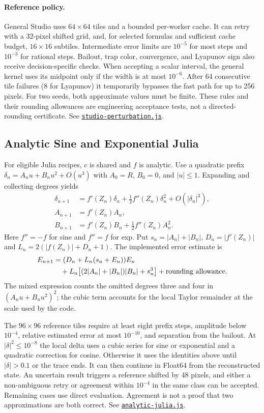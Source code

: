 \documentclass[11pt,a4paper]{article}
\numberwithin{equation}{section}
\newcommand{\abs}[1]{\lvert#1\rvert}
\newcommand{\code}[1]{\texttt{#1}}
\begin{document}
\paragraph{Reference policy.}
General Studio uses \(64\times64\) tiles and a bounded per-worker cache.
It can retry with a 32-pixel shifted grid, and, for selected formulas
and sufficient cache budget, \(16\times16\) subtiles. Intermediate
error limits are \(10^{-5}\) for most steps and \(10^{-3}\) for rational
steps. Bailout, trap color, convergence, and Lyapunov sign also receive
decision-specific checks. When accepting a scalar interval, the
general kernel uses its midpoint only if the width is at most
\(10^{-6}\). After 64 consecutive tile failures (8 for Lyapunov) it
temporarily bypasses the fast path for up to 256 pixels.
For two seeds, both approximate values must be finite. These rules and
their rounding allowances are engineering acceptance tests, not a
directed-rounding certificate. See
\href{../dist/studio-perturbation.js}{\code{studio-perturbation.js}}.

\subsection{Analytic Sine and Exponential Julia}

For eligible Julia recipes, \(c\) is shared and \(f\) is analytic.
Use a quadratic prefix \(\delta_n=A_nu+B_nu^2+O(u^3)\) with
\(A_0=R\), \(B_0=0\), and \(\abs u\le1\). Expanding and collecting
degrees yields
\begin{align}
  \delta_{n+1}
    &=f'(Z_n)\delta_n+\tfrac12f''(Z_n)\delta_n^2
      +O(\abs{\delta_n}^3),\\
  A_{n+1}&=f'(Z_n)A_n,\\
  B_{n+1}&=f'(Z_n)B_n+\tfrac12f''(Z_n)A_n^2 .
\end{align}
Here \(f''=-f\) for sine and \(f''=f\) for exp. Put
\(s_n=\abs{A_n}+\abs{B_n}\), \(D_n=\abs{f'(Z_n)}\) and
\(L_n=2(\abs{f(Z_n)}+D_n+1)\). The implemented error estimate is
\begin{align}
  E_{n+1}
     &=(D_n+L_n(s_n+E_n))E_n \notag\\
     &\quad+L_n\big[(2\abs{A_n}+\abs{B_n})\abs{B_n}+s_n^3\big]
       +\text{rounding allowance}.
\end{align}
The mixed expression counts the omitted degrees three and four in
\((A_nu+B_nu^2)^2\); the cubic term accounts for the local Taylor
remainder at the scale used by the code.

The \(96\times96\) reference tiles require at least eight prefix steps,
amplitude below \(10^{-4}\), relative estimated error at most \(10^{-10}\),
and separation from the bailout. At \(\abs\delta^2\le10^{-8}\) the
local delta uses a cubic series for sine or exponential and a
quadratic correction for cosine. Otherwise it uses the identities
above until \(\abs\delta>0.1\) or the trace ends. It can then continue
in Float64 from the reconstructed state. An uncertain result triggers
a reference shifted by 48 pixels, and either a non-ambiguous retry or
agreement within \(10^{-4}\) in the same class can be accepted.
Remaining cases use direct evaluation. Agreement is not a proof that
two approximations are both correct.
See \href{../dist/analytic-julia.js}{\code{analytic-julia.js}}.
\end{document}
